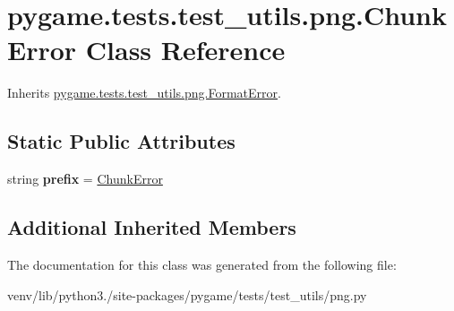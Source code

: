 \hypertarget{classpygame_1_1tests_1_1test__utils_1_1png_1_1_chunk_error}{}\section{pygame.\+tests.\+test\+\_\+utils.\+png.\+Chunk\+Error Class Reference}
\label{classpygame_1_1tests_1_1test__utils_1_1png_1_1_chunk_error}


Inherits \hyperlink{classpygame_1_1tests_1_1test__utils_1_1png_1_1_format_error}{pygame.\+tests.\+test\+\_\+utils.\+png.\+Format\+Error}.

\subsection*{Static Public Attributes}
\begin{DoxyCompactItemize}
\item 
\mbox{\label{classpygame_1_1tests_1_1test__utils_1_1png_1_1_chunk_error_ac617c71119412836a42bc51cce95e87c}} 
string {\bfseries prefix} = \textquotesingle{}\hyperlink{classpygame_1_1tests_1_1test__utils_1_1png_1_1_chunk_error}{Chunk\+Error}\textquotesingle{}
\end{DoxyCompactItemize}
\subsection*{Additional Inherited Members}


The documentation for this class was generated from the following file\+:\begin{DoxyCompactItemize}
\item 
venv/lib/python3./site-\/packages/pygame/tests/test\+\_\+utils/png.\+py\end{DoxyCompactItemize}
